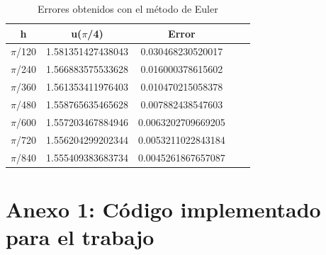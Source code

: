 \documentclass[12pt]{article}       %
\begin{document}
    \begin{table}[H]
        \centering
        \setlength\extrarowheight{3pt}
        
        \begin{tabular}{|c|c|c|c|c}
            \hline
            \textbf{h} & {\textbf{u($\pi$/4)}} & \textbf{Error} \\ 
            \hline
                $\pi$/120 & 1.581351427438043 & 0.030468230520017\\
            \hline
                $\pi$/240 & 1.566883575533628 & 0.016000378615602\\
            \hline
                $\pi$/360 & 1.561353411976403 & 0.010470215058378\\
            \hline
                $\pi$/480 & 1.558765635465628 & 0.007882438547603\\
            \hline
                $\pi$/600 & 1.557203467884946 & 0.0063202709669205\\
            \hline
                $\pi$/720 &  1.556204299202344 & 0.0053211022843184\\
            \hline
                $\pi$/840 & 1.555409383683734 & 0.0045261867657087\\
            \hline
        \end{tabular}
        
        \caption{Errores obtenidos con el método de Euler}           
    \end{table}

\section*{Anexo 1: Código implementado para el trabajo}
\end{document}
